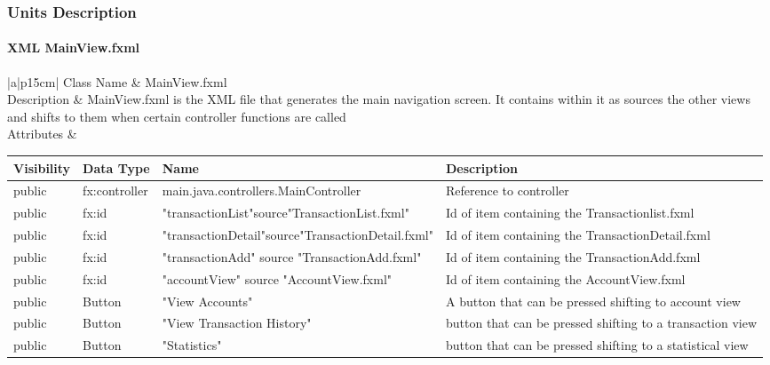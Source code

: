 \documentclass[12pt]{article}
\begin{document}
\subsubsection{Units Description}
\paragraph{XML MainView.fxml}
\begin{table}[H]
	\begin{tabular}{|a|p{15cm}|}
		\hline
		{Class Name} & {MainView.fxml} \\
		\hline
		Description & MainView.fxml is the XML file that generates the main navigation screen. It contains within it as sources the other views and shifts to them when certain controller functions are called\\
		\hline
		Attributes & 
		\begin{tabular}{| p{1.5cm} | p{2.0cm} | p{6.5cm} | p{3.45cm} |}
			\hline
			\rowcolor{lightgray}
			Visibility & Data Type & Name & Description \\
			\hline	
			\rowcolor{white}	
			\hline	
			public & fx:controller  & main.java.controllers.MainController & Reference to controller\\
			\hline		
			public & fx:id  &  "transactionList"source"TransactionList.fxml" & Id of item containing the Transactionlist.fxml\\
			\hline		
			public & fx:id  & "transactionDetail"source"TransactionDetail.fxml" & Id of item containing the TransactionDetail.fxml\\	
			\hline		
			public & fx:id  & "transactionAdd" source "TransactionAdd.fxml" & Id of item containing the TransactionAdd.fxml\\	
			\hline		
			public & fx:id  & "accountView" source "AccountView.fxml" & Id of item containing the AccountView.fxml\\	
			\hline		
			public & Button  &  "View Accounts" & A button that can be pressed shifting to account view\\	
			\hline		
			public & Button  &  "View Transaction History" & button that can be pressed shifting to a transaction view\\	
			\hline		
			public & Button  & "Statistics" & button that can be pressed shifting to a statistical view\\	
			\hline		
		\end{tabular} \\
		\hline
	\end{tabular}
\end{table}
\end{document}
